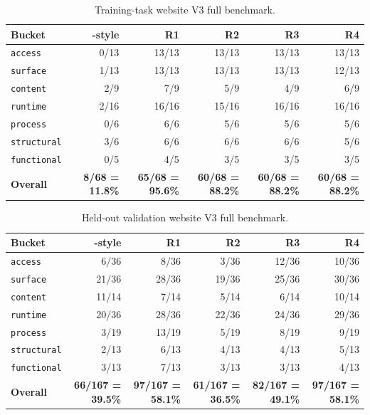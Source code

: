\begin{table}[!htbp]
\centering
\caption{Training-task website V3 full benchmark.}
\label{tab:training_v3_appendix}
\small
\begin{tabular}{lrrrrr}
\toprule
Bucket & \expel{}-style & R1 & R2 & R3 & R4 \\
\midrule
\texttt{access} & 0/13 & 13/13 & 13/13 & 13/13 & 13/13 \\
\texttt{surface} & 1/13 & 13/13 & 13/13 & 13/13 & 12/13 \\
\texttt{content} & 2/9 & 7/9 & 5/9 & 4/9 & 6/9 \\
\texttt{runtime} & 2/16 & 16/16 & 15/16 & 16/16 & 16/16 \\
\texttt{process} & 0/6 & 6/6 & 5/6 & 5/6 & 5/6 \\
\texttt{structural} & 3/6 & 6/6 & 6/6 & 6/6 & 5/6 \\
\texttt{functional} & 0/5 & 4/5 & 3/5 & 3/5 & 3/5 \\
\midrule
\textbf{Overall} & \textbf{8/68 = 11.8\%} & \textbf{65/68 = 95.6\%} & \textbf{60/68 = 88.2\%} & \textbf{60/68 = 88.2\%} & \textbf{60/68 = 88.2\%} \\
\bottomrule
\end{tabular}
\end{table}

\begin{table}[!htbp]
\centering
\caption{Held-out validation website V3 full benchmark.}
\label{tab:heldout_v3_appendix}
\small
\begin{tabular}{lrrrrr}
\toprule
Bucket & \expel{}-style & R1 & R2 & R3 & R4 \\
\midrule
\texttt{access} & 6/36 & 8/36 & 3/36 & 12/36 & 10/36 \\
\texttt{surface} & 21/36 & 28/36 & 19/36 & 25/36 & 30/36 \\
\texttt{content} & 11/14 & 7/14 & 5/14 & 6/14 & 10/14 \\
\texttt{runtime} & 20/36 & 28/36 & 22/36 & 24/36 & 29/36 \\
\texttt{process} & 3/19 & 13/19 & 5/19 & 8/19 & 9/19 \\
\texttt{structural} & 2/13 & 6/13 & 4/13 & 4/13 & 5/13 \\
\texttt{functional} & 3/13 & 7/13 & 3/13 & 3/13 & 4/13 \\
\midrule
\textbf{Overall} & \textbf{66/167 = 39.5\%} & \textbf{97/167 = 58.1\%} & \textbf{61/167 = 36.5\%} & \textbf{82/167 = 49.1\%} & \textbf{97/167 = 58.1\%} \\
\bottomrule
\end{tabular}
\end{table}

